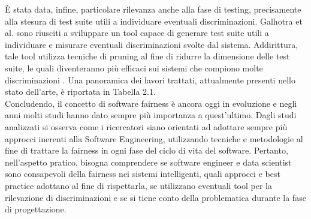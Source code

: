 È stata data, infine, particolare rilevanza anche alla fase di testing, precisamente alla stesura di test suite utili a individuare eventuali discriminazioni. Galhotra et al. sono riusciti a sviluppare un tool capace di generare test suite utili a individuare e misurare eventuali discriminazioni svolte dal sistema. Addirittura, tale tool utilizza tecniche di pruning al fine di ridurre la dimensione delle test suite, le quali diventeranno più efficaci sui sistemi che compiono molte discriminazioni \cite{galhotra2017fairness}. Una panoramica dei lavori trattati, attualmente presenti nello stato dell'arte, è riportata in Tabella 2.1.\\
Concludendo, il concetto di software fairness è ancora oggi in evoluzione e negli anni molti studi hanno dato sempre più importanza a quest'ultimo. Dagli studi analizzati si osserva come i ricercatori siano orientati ad adottare sempre più approcci inerenti alla Software Engineering, utilizzando tecniche e metodologie al fine di trattare la fairness in ogni fase del ciclo di vita del software. Pertanto, nell'aspetto pratico, bisogna comprendere se software engineer e data scientist sono consapevoli della fairness nei sistemi intelligenti, quali approcci e best practice adottano al fine di rispettarla, se utilizzano eventuali tool per la rilevazione di discriminazioni e se si tiene conto della problematica durante la fase di progettazione.
\newpage